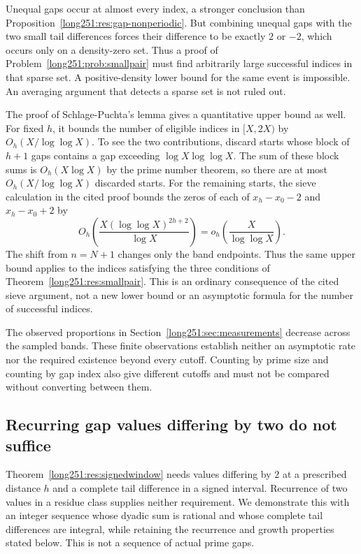 \documentclass[11pt]{article}
\begin{document}
Unequal gaps occur at almost every index, a stronger conclusion than
Proposition~\ref{long251:res:gap-nonperiodic}.  But combining unequal gaps
with the two small tail differences forces their difference to be exactly
$2$ or $-2$, which occurs only on a density-zero set.  Thus a proof of
Problem~\ref{long251:prob:smallpair} must find arbitrarily large successful
indices in that sparse set.  A positive-density lower bound for the same
event is impossible.  An averaging argument that detects a sparse set is
not ruled out.

The proof of Schlage-Puchta's lemma gives a quantitative upper bound as
well.  For fixed $h$, it bounds the number of eligible indices in
$[X,2X)$ by $O_h(X/\log\log X)$.  To see the two contributions, discard
starts whose block of $h+1$ gaps contains a gap exceeding
$\log X\log\log X$.  The sum of these block sums is $O_h(X\log X)$
by the prime number theorem, so there are at most
$O_h(X/\log\log X)$ discarded starts.  For the remaining starts, the
sieve calculation in the cited proof bounds the zeros of each of
$x_h-x_0-2$ and $x_h-x_0+2$ by
\[
 O_h\!\left(\frac{X(\log\log X)^{2h+2}}{\log X}\right)
 =o_h\!\left(\frac{X}{\log\log X}\right).
\]
The shift from $n=N+1$ changes only the band endpoints.  Thus the
same upper bound applies to the indices satisfying the three conditions
of Theorem~\ref{long251:res:smallpair}.  This is an ordinary
consequence of the cited sieve argument, not a new lower bound or an
asymptotic formula for the number of successful indices.

The observed proportions in Section~\ref{long251:sec:measurements} decrease
across the sampled bands.  These finite observations establish neither
an asymptotic rate nor the required existence beyond every cutoff.
Counting by prime size and counting by gap index also give different
cutoffs and must not be compared without converting between them.

\subsection{Recurring gap values differing by two do not suffice}

Theorem~\ref{long251:res:signedwindow} needs values differing by $2$
at a prescribed distance $h$ and a complete tail difference in a signed
interval.  Recurrence of two values in a residue class supplies neither
requirement.  We demonstrate this with an integer sequence whose dyadic
sum is rational and whose complete tail differences are integral,
while retaining the recurrence and growth properties stated below.
This is not a sequence of actual prime gaps.
\end{document}
